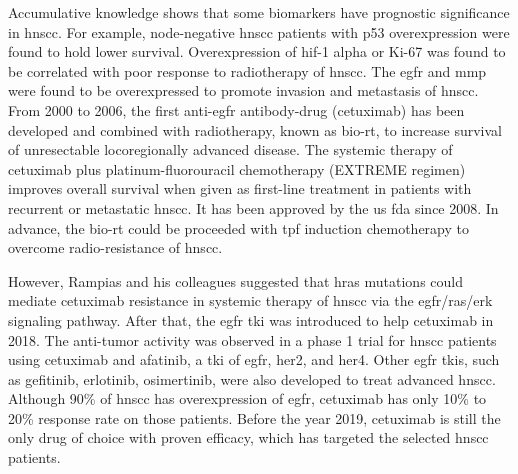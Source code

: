 \documentclass[jpm,article,submit,moreauthors,pdftex]{Definitions/mdpi}
\begin{document}
Accumulative knowledge shows that some biomarkers have prognostic significance in \acrshort{hnscc}. For example, node-negative \acrshort{hnscc} patients with p53 overexpression were found to hold lower survival\cite{DeVicente2004}.
Overexpression of \acrfull{hif}-1 alpha\cite{Aebersold2001} or Ki-67\cite{Couture2002} was found to be correlated with poor response to radiotherapy of \acrshort{hnscc}. The \acrfull{egfr}\cite{O-Charoenrat2000}\cite{Bentzen2005} and \acrfull{mmp}\cite{Harrington2017} were found to be overexpressed to promote invasion and metastasis of \acrshort{hnscc}.
From 2000 to 2006, the first anti-\acrshort{egfr} antibody-drug (cetuximab) has been developed and combined with radiotherapy, known as bio-\acrshort{rt}, to increase survival of unresectable locoregionally advanced disease\cite{Bonner2006a}.
The systemic therapy of cetuximab plus platinum-fluorouracil chemotherapy (EXTREME regimen) improves overall survival when given as first-line treatment in patients with recurrent or metastatic \acrshort{hnscc}\cite{Vermorken2008}\cite{Rivera2009}. It has been approved by the \acrshort{us} \acrfull{fda} since 2008. In advance, the bio-\acrshort{rt} could be proceeded with \acrfull{tpf} induction chemotherapy to overcome  radio-resistance of \acrshort{hnscc}\cite{Blanchard2013}.

However, Rampias and his colleagues\cite{Rampias2014} suggested that \acrfull{hras} mutations could mediate cetuximab resistance in systemic therapy of \acrshort{hnscc} via the \acrshort{egfr}/\acrfull{ras}/\acrfull{erk} signaling pathway.
After that, the \acrshort{egfr} \acrfull{tki} was introduced to help cetuximab in 2018. The anti-tumor activity was observed in a phase 1 trial for \acrshort{hnscc} patients using cetuximab and afatinib, a \acrshort{tki} of \acrshort{egfr}, \acrfull{her}2, and \acrshort{her}4\cite{Gazzah2018}. Other \acrshort{egfr} \acrshort{tki}s, such as gefitinib, erlotinib, osimertinib, were also developed to treat advanced \acrshort{hnscc}.
Although 90\% of \acrshort{hnscc} has overexpression of \acrshort{egfr}, cetuximab has only 10\% to 20\% response rate on those patients. Before the year 2019, cetuximab is still the only drug of choice with proven efficacy, which has targeted the selected \acrshort{hnscc} patients\cite{Taberna2019}.
\end{document}
